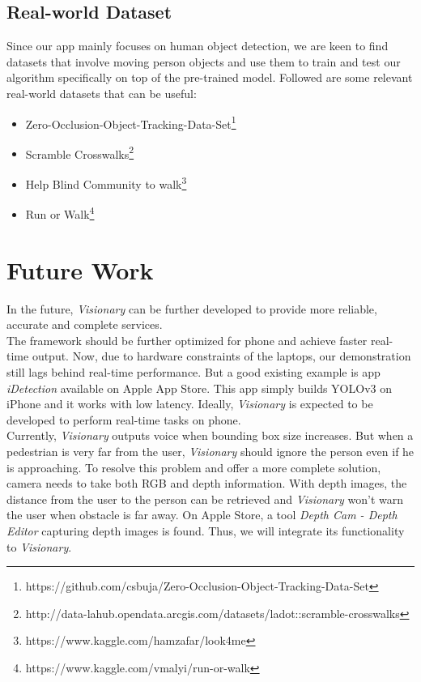 \documentclass[letterpaper]{article} %
\begin{document}
\subsection{Real-world Dataset}
Since our app mainly focuses on human object detection, we are keen to find datasets that involve moving person objects and use them to train and test our algorithm specifically on top of the pre-trained model. Followed are some relevant real-world datasets that can be useful:
\begin{itemize}
    \item Zero-Occlusion-Object-Tracking-Data-Set\footnote{https://github.com/csbuja/Zero-Occlusion-Object-Tracking-Data-Set}
    \item Scramble Crosswalks\footnote{http://data-lahub.opendata.arcgis.com/datasets/ladot::scramble-crosswalks}
    \item Help Blind Community to walk\footnote{https://www.kaggle.com/hamzafar/look4me}
    \item Run or Walk\footnote{https://www.kaggle.com/vmalyi/run-or-walk}
\end{itemize}

\section{Future Work}
In the future, \textit{Visionary} can be further developed to provide more reliable, accurate and complete services.\\

\noindent The framework should be further optimized for phone and achieve faster real-time output. Now, due to hardware constraints of the laptops, our demonstration still lags behind real-time performance. But a good existing example is app \textit{iDetection} available on Apple App Store. This app simply builds YOLOv3 on iPhone and it works with low latency. Ideally, \textit{Visionary} is expected to be developed to perform real-time tasks on phone.\\ 

\noindent Currently, \textit{Visionary} outputs voice when bounding box size increases. But when a pedestrian is very far from the user, \textit{Visionary} should ignore the person even if he is approaching. To resolve this problem and offer a more complete solution, camera needs to take both RGB and depth information. With depth images, the distance from the user to the person can be retrieved and \textit{Visionary} won't warn the user when obstacle is far away. On Apple Store, a tool \textit{Depth Cam - Depth Editor} capturing depth images is found. Thus, we will integrate its functionality to \textit{Visionary}.
\end{document}

